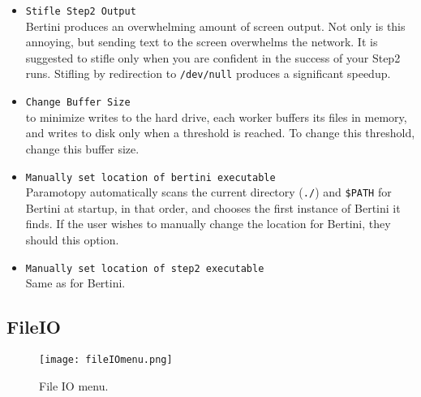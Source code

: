 \begin{itemize}

	\item \texttt{Stifle Step2 Output} \\ Bertini produces an overwhelming amount of screen output.  Not only is this annoying, but sending text to the screen overwhelms the network.  It is suggested to stifle only when you are confident in the success of your Step2 runs.  Stifling by redirection to \texttt{/dev/null} produces a significant speedup.
	
	\item \texttt{Change Buffer Size}\\ to minimize writes to the hard drive, each worker buffers its files in memory, and writes to disk only when a threshold is reached.  To change this threshold, change this buffer size.
	
	\item \texttt{Manually set location of bertini executable} \\ Paramotopy automatically scans the current directory (\texttt{./}) and \texttt{\$PATH} for Bertini at startup, in that order, and chooses the first instance of Bertini it finds.  If the user wishes to manually change the location for Bertini, they should this option.
	
	\item \texttt{Manually set location of step2 executable} \\  Same as for Bertini.
	
	
\end{itemize}




\subsection{FileIO}
\label{sec:fileIO}

\begin{figure}[h]
\begin{center}
\texttt{[image: fileIOmenu.png]}
\caption[File IO Menu]{File IO menu.}
\label{screen:fileIOmenu}
\end{center}
\end{figure}


